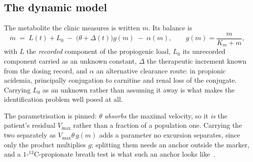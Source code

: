 \subsection{The dynamic model}
\label{sec:parent}

The metabolite the clinic measures is written $m$. Its balance is
\begin{equation}
\dot m \;=\; L(t) + L_0 \;-\; \bigl(\theta + \Delta(t)\bigr) g(m) \;-\; \alpha(m),
\qquad g(m) = \frac{m}{K_m + m},
\label{eq:parent}
\end{equation}
with $L$ the \emph{recorded} component of the propiogenic load, $L_0$ its unrecorded
component carried as an unknown constant, $\Delta$ the therapeutic increment known from
the dosing record, and $\alpha$ an alternative clearance route: in propionic acidemia,
principally conjugation to carnitine and renal loss of the conjugate. Carrying $L_0$ as an
unknown rather than assuming it away is what makes the identification problem well posed
at all.

The parametrisation is pinned: $\theta$ \emph{absorbs} the maximal velocity, so it
\emph{is} the patient's residual $V_{\max}$ rather than a fraction of a population one.
Carrying the two separately as $V_{\max}\theta\,g(m)$ adds a parameter no excursion
separates, since only the product multiplies $g$; splitting them needs an anchor outside
the marker, and a $1$-$^{13}$C-propionate breath test is what such an anchor looks
like~\cite{breath_test_mma}. %

